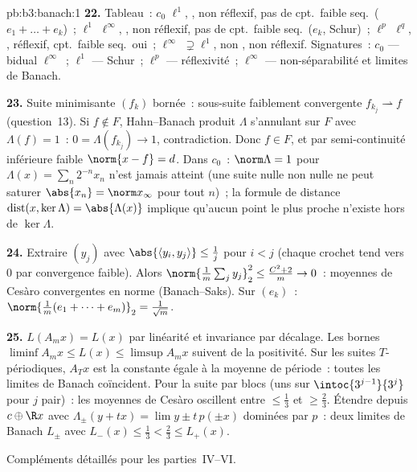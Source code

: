 \begin{solution}{pb:b3:banach:1}
\textbf{22.} Tableau~: $c_0$  $\ell^1$, , non
réflexif, pas de cpt.\ faible seq.\ ($e_1+\dots+e_k$)~;
$\ell^1$  $\ell^\infty$, , non réflexif, pas de
cpt.\ faible seq.\ ($e_k$, Schur)~; $\ell^p$  $\ell^q$,
, réflexif, cpt.\ faible seq.\ oui~; $\ell^\infty$
 $\supsetneq\ell^1$, non , non réflexif. Signatures~:
$c_0$ --- bidual $\ell^\infty$~; $\ell^1$ --- Schur~;
$\ell^p$ --- réflexivité~; $\ell^\infty$ --- non-séparabilité
et limites de Banach.

\textbf{23.} Suite minimisante $(f_k)$ bornée~: sous-suite
faiblement convergente $f_{k_j} \rightharpoonup f$
(question~13). Si $f \notin F$, Hahn--Banach produit
$\Lambda$ s'annulant sur $F$ avec $\Lambda(f) = 1$~: $0 =
\Lambda(f_{k_j}) \to 1$, contradiction. Donc $f \in F$, et
par semi-continuité inférieure faible $\norm{x - f} = d$.
Dans $c_0$~: $\norm\Lambda = 1$ pour $\Lambda(x) =
\sum_n2^{-n}x_n$ n'est jamais atteint (une suite nulle non
nulle ne peut saturer $\abs{x_n} = \norm x_\infty$ pour tout
$n$)~; la formule de distance $\operatorname{dist}(x,
\ker\Lambda) = \abs{\Lambda(x)}$ implique qu'aucun point le
plus proche n'existe hors de $\ker\Lambda$.

\textbf{24.} Extraire $(y_j)$ avec $\abs{\langle y_i,
y_j\rangle} \leq \frac1j$ pour $i < j$ (chaque crochet tend
vers $0$ par convergence faible). Alors
$\norm{\frac1m\sum_j y_j}_2^2 \leq \frac{C^2+2}m \to 0$~:
moyennes de Cesàro convergentes en norme (Banach--Saks). Sur
$(e_k)$~: $\norm{\frac1m(e_1+\dots+e_m)}_2 =
\frac1{\sqrt m}$.

\textbf{25.} $L(A_mx) = L(x)$ par linéarité et invariance par
décalage. Les bornes $\liminf A_mx \leq L(x) \leq \limsup
A_mx$ suivent de la positivité. Sur les suites $T$-périodiques,
$A_Tx$ est la constante égale à la moyenne de période~: toutes
les limites de Banach coïncident. Pour la suite par blocs
(uns sur $\intoc{3^{j-1}}{3^j}$ pour $j$ pair)~: les
moyennes de Cesàro oscillent entre $\leq \frac13$ et $\geq
\frac23$. Étendre depuis $c \oplus \R x$ avec $\Lambda_\pm(y
+ tx) = \lim y \pm t\,p(\pm x)$ dominées par $p$~: deux
limites de Banach $L_\pm$ avec $L_-(x) \leq \frac13 <
\frac23 \leq L_+(x)$.


Compléments détaillés pour les parties~IV--VI.


\end{solution}
